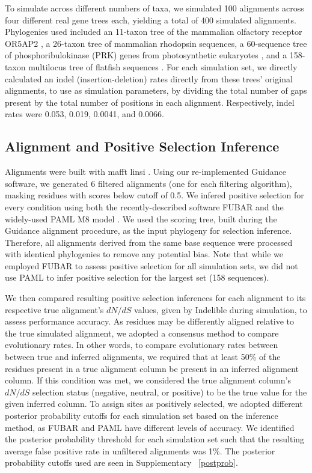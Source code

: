 \documentclass[12pt]{article}
\begin{document}
To simulate across different numbers of taxa, we simulated 100 alignments across four different real gene trees each, yielding a total of 400 simulated alignments. Phylogenies used included an 11-taxon tree of the mammalian olfactory receptor OR5AP2 \citep{Spielman2013}, a 26-taxon tree of mammalian rhodopsin sequences\citep{Spielman2013}, a 60-sequence tree of phosphoribulokinase (PRK) genes from photosynthetic eukaryotes \citep{Yang2011}, and a 158-taxon multilocus tree of flatfish sequences \citep{Betancur2013}.
For each simulation set, we directly calculated an indel (insertion-deletion) rates directly from these trees’ original alignments, to use as simulation parameters, by dividing the total number of gaps present by the total number of positions in each alignment. Respectively, indel rates were 0.053, 0.019, 0.0041, and 0.0066. 

\subsection*{Alignment and Positive Selection Inference}
Alignments were built with mafft linsi \citep{Katoh2002,Katoh2005}. Using our re-implemented Guidance software, we generated 6 filtered alignments (one for each filtering algorithm), masking residues with scores below cutoff of 0.5. We infered positive selection for every condition using both the recently-described software FUBAR \citep{Murrell2013} and the widely-used PAML M8 model \citep{Yang2007}. We used the scoring tree, built during the Guidance alignment procedure, as the input phylogeny for selection inference. Therefore, all alignments derived from the same base sequence were processed with identical phylogenies to remove any potential bias. Note that while we employed FUBAR to assess positive selection for all simulation sets, we did not use PAML to infer positive selection for the largest set (158 sequences).

We then compared resulting positive selection inferences for each alignment to its respective true alignment's $dN/dS$ values, given by Indelible during simulation, to assess performance accuracy. As residues may be differently aligned relative to the true simulated alignment, we adopted a consensus method to compare evolutionary rates. In other words, to compare evolutionary rates between between true and inferred alignments, we required that at least 50\% of the residues present in a true alignment column be present in an inferred alignment column. If this condition was met, we considered the true alignment column’s $dN/dS$  selection status (negative, neutral, or positive) to be the true value for the given inferred column. To assign sites as positively selected, we adopted different posterior probability cutoffs for each simulation set based on the inference method, as FUBAR and PAML have different levels of accuracy. We identified the posterior probability threshold for each simulation set such that the resulting average false positive rate in unfiltered alignments was 1\%. The posterior probability cutoffs used are seen in Supplementary ~\ref{postprob}.
\end{document}
